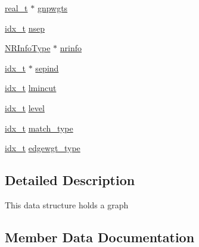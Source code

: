 \begin{DoxyCompactItemize}
\item 
\hyperlink{3rd_party_2parmetis-4_80_83_2metis_2include_2metis_8h_a1924a4f6907cc3833213aba1f07fcbe9}{real\+\_\+t} $\ast$ \hyperlink{structgraph__t_abd6440df752ea758f4baea705afd3bec}{gnpwgts}
\item 
\hyperlink{3rd_party_2parmetis-4_80_83_2metis_2include_2metis_8h_aaa5262be3e700770163401acb0150f52}{idx\+\_\+t} \hyperlink{structgraph__t_a723e8c2de97704284f492b53c21e9fad}{nsep}
\item 
\hyperlink{libparmetis_2struct_8h_a6393d515f02fcdaf17a06297a8db5bbb}{N\+R\+Info\+Type} $\ast$ \hyperlink{structgraph__t_a2ee093704fdbad45e3108505bbd29594}{nrinfo}
\item 
\hyperlink{3rd_party_2parmetis-4_80_83_2metis_2include_2metis_8h_aaa5262be3e700770163401acb0150f52}{idx\+\_\+t} $\ast$ \hyperlink{structgraph__t_ad3013a301ba5be9f81a8b53667d16c3d}{sepind}
\item 
\hyperlink{3rd_party_2parmetis-4_80_83_2metis_2include_2metis_8h_aaa5262be3e700770163401acb0150f52}{idx\+\_\+t} \hyperlink{structgraph__t_a92aa28928a30f09c684bea12ae2a5a9e}{lmincut}
\item 
\hyperlink{3rd_party_2parmetis-4_80_83_2metis_2include_2metis_8h_aaa5262be3e700770163401acb0150f52}{idx\+\_\+t} \hyperlink{structgraph__t_a8ee3c5b86b691e2c96f78bffec6d46f2}{level}
\item 
\hyperlink{3rd_party_2parmetis-4_80_83_2metis_2include_2metis_8h_aaa5262be3e700770163401acb0150f52}{idx\+\_\+t} \hyperlink{structgraph__t_a674a01b43ab31ef9196cf4f24ac75452}{match\+\_\+type}
\item 
\hyperlink{3rd_party_2parmetis-4_80_83_2metis_2include_2metis_8h_aaa5262be3e700770163401acb0150f52}{idx\+\_\+t} \hyperlink{structgraph__t_ae70d9595efe0791ad2585b7a54ff1f6b}{edgewgt\+\_\+type}
\end{DoxyCompactItemize}


\subsection{Detailed Description}
This data structure holds a graph 

\subsection{Member Data Documentation}
\mbox{\label{structgraph__t_a0301c5a80081df93c122992f779ded24}} 
